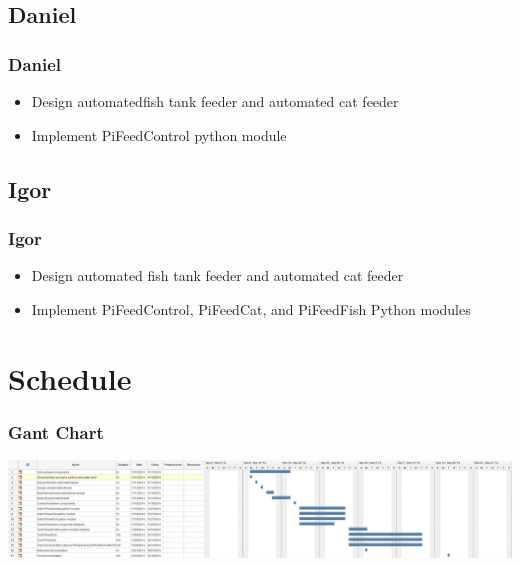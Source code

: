 \documentclass[]{beamer}
\begin{document}
\subsection{Daniel}
\begin{frame}
	\frametitle{Daniel}
	\begin{itemize}
    	\item Design automatedfish tank feeder and automated cat feeder
        \item Implement PiFeedControl python module
    \end{itemize}
\end{frame}

\subsection{Igor}
\begin{frame}
	\frametitle{Igor}
	\begin{itemize}
    	\item Design automated fish tank feeder and automated cat feeder
        \item Implement PiFeedControl, PiFeedCat, and PiFeedFish Python modules
    \end{itemize}
\end{frame}



\section{Schedule}
\begin{frame}
	\frametitle{Gant Chart}
     \includegraphics[width=\textwidth]{Gant}
\end{frame}
\end{document}
